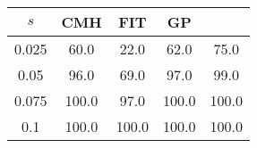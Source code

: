 \centering \begin{tabular}{c|c|c|c|c}
$s$	&CMH	&FIT	&GP	&\sc{Clear}\\\hline
0.025	&60.0	&22.0	&62.0	&75.0\\
0.05	&96.0	&69.0	&97.0	&99.0\\
0.075	&100.0	&97.0	&100.0	&100.0\\
0.1	&100.0	&100.0	&100.0	&100.0\\
\end{tabular}
